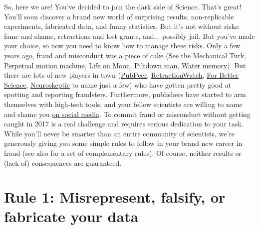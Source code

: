 \documentclass[a4paper,10pt,onecolumn]{article}
\begin{document}
So, here we are! You've decided to join the dark side of Science. That's great!
You'll soon discover a brand new world of surprising results,
non-replicable experiments, fabricated data, and funny statistics. But it's not without risks: fame and shame,
retractions and lost grants, and... possibly jail. But you've made your choice, so now you need to know how to manage these risks. Only a few years ago, fraud and misconduct was a piece of
cake (See the \href{https://en.wikipedia.org/wiki/The_Turk}{Mechanical Turk},
\href{https://en.wikipedia.org/wiki/Charles_Redheffer}{Perpetual motion
  machine}, \href{https://en.wikipedia.org/wiki/Great_Moon_Hoax}{Life on Moon},
\href{https://en.wikipedia.org/wiki/Piltdown_Man}{Piltdown man},
\href{https://en.wikipedia.org/wiki/Water_memory}{Water memory}). But there are lots of new players in town (\href{https://pubpeer.com}{PubPeer},
\href{http://retractionwatch.com}{RetractionWatch},
\href{https://forbetterscience.com}{For Better Science},
\href{http://blogs.discovermagazine.com/neuroskeptic/}{Neuroskeptic} to name
just a few) who have gotten pretty good at spotting and reporting fraudsters.
Furthermore, publishers have started to arm themselves with high-tech tools, and your fellow scientists are willing to name and shame you \href{https://www.youtube.com/watch?v=FXaOqwanWnU/}{on social media}. To
commit fraud or misconduct without getting caught in 2017 is a real
challenge and requires serious dedication to your task. While you'll never be smarter than an entire community of scientists, we're generously giving you some
simple rules to follow in your brand new career in fraud (see also \citep{timmer:2012}
for a set of complementary rules). Of course, neither results or (lack of) consequences are 
guaranteed.



\section*{Rule 1: Misrepresent, falsify, or fabricate your data}
\end{document}
